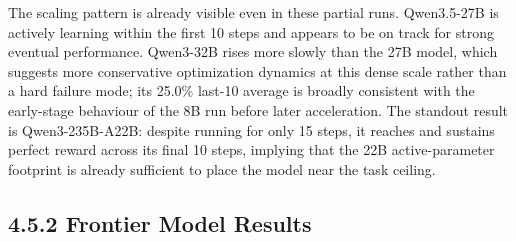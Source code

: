 \documentclass[
  american,
  11pt,
  a4paper,
  oneside]{report}
\begin{document}
The scaling pattern is already visible even in these partial runs.
Qwen3.5-27B is actively learning within the first 10 steps and appears
to be on track for strong eventual performance. Qwen3-32B rises more
slowly than the 27B model, which suggests more conservative optimization
dynamics at this dense scale rather than a hard failure mode; its 25.0\%
last-10 average is broadly consistent with the early-stage behaviour of
the 8B run before later acceleration. The standout result is
Qwen3-235B-A22B: despite running for only 15 steps, it reaches and
sustains perfect reward across its final 10 steps, implying that the 22B
active-parameter footprint is already sufficient to place the model near
the task ceiling.

\subsection{4.5.2 Frontier Model Results}\label{frontier-model-results}
\end{document}
